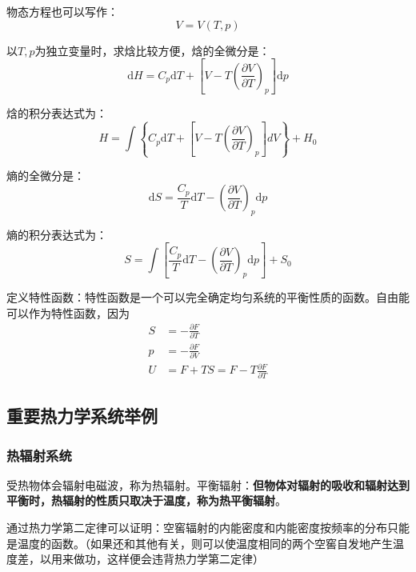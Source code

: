 \documentclass[UTF8]{ctexart}
\newcommand{\dif}{\mathrm{d}}
\begin{document}
	物态方程也可以写作：
	\begin{equation}
	V = V(T,p)
	\end{equation}
	
	以$ T,p $为独立变量时，求焓比较方便，焓的全微分是：
	\begin{equation}
		\dif H = C_{p} \dif T +\left[V-T \left(\frac{\partial V}{\partial T}\right)_{p}\right] \dif p
	\end{equation}
	
\noindent 焓的积分表达式为：
\begin{equation}
	H=\int\left\{C_{p} \dif T+\left[V-T\left(\frac{\partial V}{\partial T}\right)_{p}\right] d V\right\} + H_{0}
\end{equation}

	熵的全微分是：
	\begin{equation}
		\dif S = \frac{C_{p}}{T} \dif T - \left(\frac{\partial V}{\partial T}\right)_{p} \dif p
	\end{equation}
	
\noindent 熵的积分表达式为：
\begin{equation}
	S = \int \left[\frac{C_{p}}{T} \dif T - \left(\frac{\partial V}{\partial T}\right)_{p} \dif p\right]+ S_{0}
\end{equation}

	定义特性函数：特性函数是一个可以完全确定均匀系统的平衡性质的函数。自由能可以作为特性函数，因为
	\begin{equation}
	\begin{aligned}
	S&= - \frac{\partial F}{\partial T} \\
	p&= - \frac{\partial F}{\partial V} \\
	U&= F+TS=F-T \frac{\partial F}{\partial T}
	\end{aligned}
	\end{equation}
	
	\subsection{重要热力学系统举例}
	\subsubsection{热辐射系统}
	
	受热物体会辐射电磁波，称为热辐射。平衡辐射：\textbf{但物体对辐射的吸收和辐射达到平衡时，热辐射的性质只取决于温度，称为热平衡辐射}。
	
	通过热力学第二定律可以证明：空窖辐射的内能密度和内能密度按频率的分布只能是温度的函数。（如果还和其他有关，则可以使温度相同的两个空窖自发地产生温度差，以用来做功，这样便会违背热力学第二定律）
	
\end{document}
